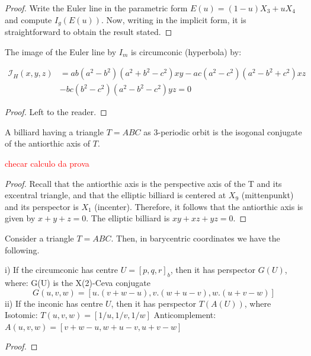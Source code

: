 	\begin{proof} Write the Euler line in the parametric form $E(u)=(1-u)X_3+uX_4$ and compute $I_g(E(u))$. Now, writing in the implicit form, it is straightforward to obtain the result stated.
	\end{proof}
	
		\begin{proposition} The image of the Euler line by $I_m$ is circumconic (hyperbola)  by:
	
	\begin{align*}
\mathcal{I}_H(x,y,z)&= a b (a^2 - b^2) (a^2 + b^2 - c^2) x y - a c (a^2 - c^2) (a^2 - b^2 + c^2) x z \\
&- b c (b^2 - c^2) (a^2 - b^2 - c^2)y z=0
	\end{align*}
	
	\end{proposition}
	
	\begin{proof}
	Left to the reader.
	\end{proof}
	
	\begin{proposition} A   billiard  having a triangle $T=ABC$ as 3-periodic orbit is the isogonal conjugate of the antiorthic axis of $T$.
 \label{prop:appA-billiard-antiorthic}
	\end{proposition}
	\textcolor{red}{checar calculo da prova}
	\begin{proof}
	Recall that the antiorthic axis  is the perspective axis of the T and its excentral triangle, and that the elliptic billiard is centered at $X_9$ (mittenpunkt) and its perspector is   $X_1$ (incenter).
	Therefore, it follows that the antiorthic axis is given by $x+y+z=0$.
The elliptic billiard is $xy+xz+yz=0$.
	\end{proof}
	
	\begin{proposition}
Consider a triangle $T=ABC$. Then, in barycentric coordinates we have the following.

\noindent i) If the  circumconic has centre $U=[p,q,r]_b$, then it has perspector $G(U)$, where:
G(U) is the X(2)-Ceva conjugate  
\[ G(u,v,w) = [u.(v+w-u), v.(w+u-v), w.(u+v-w)]\]
\noindent ii) If the  inconic has centre $U$, then it has perspector $T(A(U))$, where
Isotomic: $T(u,v,w) = [1/u,1/v,1/w]$
Anticomplement: $A(u,v,w) = [v+w-u, w+u-v, u+v-w]$
		\end{proposition}
		
		\begin{proof}
		
		\end{proof}
%	
